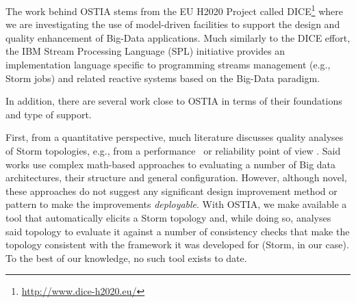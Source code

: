 
The work behind OSTIA stems from the EU H2020 Project called DICE\footnote{\url{http://www.dice-h2020.eu/}} where we are investigating the use of model-driven facilities to support the design and quality enhancement of Big-Data applications. Much similarly to the DICE effort, the IBM Stream Processing Language (SPL) initiative \cite{ibmspl} provides an implementation language specific to programming streams management (e.g., Storm jobs) and related reactive systems based on the Big-Data paradigm. 

In addition, there are several work close to OSTIA in terms of their foundations and type of support. 

First, from a quantitative perspective, much literature discusses quality analyses of Storm topologies, e.g., from a performance~\cite{perfbd} or reliability point of view \cite{bigdatareliab}. Said works use complex math-based approaches to evaluating a number of Big data architectures, their structure and general configuration. However, although novel, these approaches do not suggest any significant design improvement method or pattern to make the improvements \emph{deployable}. With OSTIA, we make available a tool that automatically elicits a Storm topology and, while doing so, analyses said topology to evaluate it against a number of consistency checks that make the topology consistent with the framework it was developed for (Storm, in our case). To the best of our knowledge, no such tool exists to date. 

